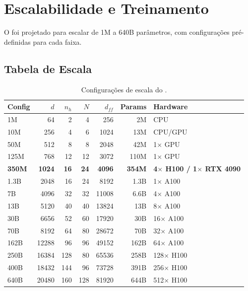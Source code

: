 
\section{Escalabilidade e Treinamento}
\label{sec:escalabilidade}

O \aletheion{} foi projetado para escalar de 1M a 640B par\^ametros,
com configura\c{c}\~oes pr\'e-definidas para cada faixa.

\subsection{Tabela de Escala}

\begin{table}[H]
\centering
\caption{Configura\c{c}\~oes de escala do \aletheion{}.}
\label{tab:scaling}
\begin{tabular}{lrrrrrl}
\toprule
\textbf{Config} & \textbf{$d$} & \textbf{$n_h$} & \textbf{$N$} & \textbf{$d_{ff}$} & \textbf{Params} & \textbf{Hardware} \\
\midrule
1M & 64 & 2 & 4 & 256 & ~2M & CPU \\
10M & 256 & 4 & 6 & 1024 & ~13M & CPU/GPU \\
50M & 512 & 8 & 8 & 2048 & ~42M & 1$\times$ GPU \\
125M & 768 & 12 & 12 & 3072 & ~110M & 1$\times$ GPU \\
\textbf{350M} & \textbf{1024} & \textbf{16} & \textbf{24} & \textbf{4096} & \textbf{~354M} & \textbf{4$\times$ H100 / 1$\times$ RTX 4090} \\
1.3B & 2048 & 16 & 24 & 8192 & ~1.3B & 1$\times$ A100 \\
7B & 4096 & 32 & 32 & 11008 & ~6.6B & 4$\times$ A100 \\
13B & 5120 & 40 & 40 & 13824 & ~13B & 8$\times$ A100 \\
30B & 6656 & 52 & 60 & 17920 & ~30B & 16$\times$ A100 \\
70B & 8192 & 64 & 80 & 28672 & ~70B & 32$\times$ A100 \\
162B & 12288 & 96 & 96 & 49152 & ~162B & 64$\times$ A100 \\
250B & 16384 & 128 & 80 & 65536 & ~258B & 128$\times$ H100 \\
400B & 18432 & 144 & 96 & 73728 & ~391B & 256$\times$ H100 \\
640B & 20480 & 160 & 128 & 81920 & ~644B & 512$\times$ H100 \\
\bottomrule
\end{tabular}
\end{table}

